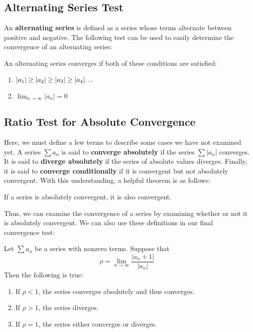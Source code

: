 \documentclass[11pt]{article}
\begin{document}

\subsection{Alternating Series Test}
An \textbf{alternating series} is defined as a series whose terms alternate between positive and negative. The following test can be used to easily determine the convergence of an alternating series:\\

\begin{center}
An alternating series converges if both of these conditions are satisfied:
\begin{enumerate}
    \item $|a_1|\geq|a_2|\geq|a_3|\geq|a_4|\text{\dots}$
    \item $\lim_{n \to \infty}|a_n|=0$
\end{enumerate}
\end{center}
\vspace{0.5 cm}


\subsection{Ratio Test for Absolute Convergence}
Here, we must define a few terms to describe some cases we have not examined yet. A series $\sum a_n$ is said to \textbf{converge absolutely} if the series $\sum |a_n|$ converges. It is said to \textbf{diverge absolutely} if the series of absolute values diverges. Finally, it is said to \textbf{converge conditionally} if it is convergent but not absolutely convergent. With this understanding, a helpful theorem is as follows:\\

\begin{center}
If a series is absolutely convergent, it is also convergent.
\end{center}
\vspace{0.5 cm}


Thus, we can examine the convergence of a series by examining whether or not it is absolutely convergent. We can also use these definitions in our final convergence test:

\begin{center}
Let $\sum a_n$ be a series with nonzero terms. Suppose that
\[ \rho = \lim_{n \to \infty} \frac{|a_n+1|}{|a_n|}\]
Then the following is true:\\

\begin{center}
\begin{enumerate}
    \item If $\rho<1$, the series converges absolutely and thus converges.
    \item If $\rho>1$, the series diverges.
    \item If $\rho=1$, the series either converges or diverges.
\end{enumerate}
\end{center}
\vspace{0.5 cm}
\end{center}
\end{document}
